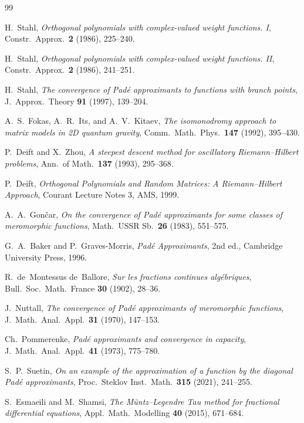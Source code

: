 \documentclass[11pt]{article}
\theoremstyle{definition}
\theoremstyle{remark}
\begin{document}
\begin{thebibliography}{99}

H.~Stahl, \emph{Orthogonal polynomials with complex-valued weight functions. I}, Constr.\ Approx.\ \textbf{2} (1986), 225--240.

H.~Stahl, \emph{Orthogonal polynomials with complex-valued weight functions. II}, Constr.\ Approx.\ \textbf{2} (1986), 241--251.

H.~Stahl, \emph{The convergence of Pad\'e approximants to functions with branch points}, J.~Approx.\ Theory \textbf{91} (1997), 139--204.

A.~S.~Fokas, A.~R.~Its, and A.~V.~Kitaev, \emph{The isomonodromy approach to matrix models in 2D quantum gravity}, Comm.\ Math.\ Phys.\ \textbf{147} (1992), 395--430.

P.~Deift and X.~Zhou, \emph{A steepest descent method for oscillatory Riemann--Hilbert problems}, Ann.\ of Math.\ \textbf{137} (1993), 295--368.

P.~Deift, \emph{Orthogonal Polynomials and Random Matrices: A Riemann--Hilbert Approach}, Courant Lecture Notes 3, AMS, 1999.

A.~A.~Gon\v{c}ar, \emph{On the convergence of Pad\'e approximants for some classes of meromorphic functions}, Math.\ USSR Sb.\ \textbf{26} (1983), 551--575.

G.~A.~Baker and P.~Graves-Morris, \emph{Pad\'e Approximants}, 2nd ed., Cambridge University Press, 1996.

R.~de~Montessus de~Ballore, \emph{Sur les fractions continues alg\'ebriques}, Bull.\ Soc.\ Math.\ France \textbf{30} (1902), 28--36.

J.~Nuttall, \emph{The convergence of Pad\'e approximants of meromorphic functions}, J.~Math.\ Anal.\ Appl.\ \textbf{31} (1970), 147--153.

Ch.~Pommerenke, \emph{Pad\'e approximants and convergence in capacity}, J.~Math.\ Anal.\ Appl.\ \textbf{41} (1973), 775--780.

S.~P.~Suetin, \emph{On an example of the approximation of a function by the diagonal Pad\'e approximants}, Proc.\ Steklov Inst.\ Math.\ \textbf{315} (2021), 241--255.

S.~Esmaeili and M.~Shamsi, \emph{The M\"untz--Legendre Tau method for fractional differential equations}, Appl.\ Math.\ Modelling \textbf{40} (2015), 671--684.


\end{thebibliography}
\end{document}
